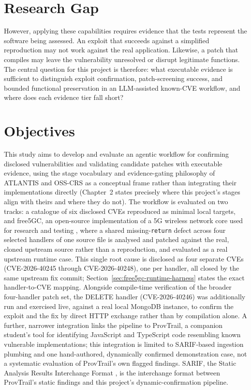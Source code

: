 \documentclass[12pt,a4paper]{report}
\begin{document}
\section{Research Gap}

However, applying these capabilities requires evidence that the tests represent the software being assessed. An exploit that succeeds against a simplified reproduction may not work against the real application. Likewise, a patch that compiles may leave the vulnerability unresolved or disrupt legitimate functions. The central question for this project is therefore: what executable evidence is sufficient to distinguish exploit confirmation, patch-screening success, and bounded functional preservation in an LLM-assisted known-CVE workflow, and where does each evidence tier fall short?

\section{Objectives}

This study aims to develop and evaluate an agentic workflow for confirming disclosed vulnerabilities and validating candidate patches with executable evidence, using the stage vocabulary and evidence-gating philosophy of ATLANTIS and OSS-CRS as a conceptual frame rather than integrating their implementations directly (Chapter~2 states precisely where this project's stages align with theirs and where they do not). The workflow is evaluated on two tracks: a catalogue of six disclosed CVEs reproduced as minimal local targets, and free5GC, an open-source implementation of a 5G wireless network core used for research and testing \cite{free5gc}, where a shared missing-\texttt{return} defect across four selected handlers of one source file is analysed and patched against the real, cloned upstream source rather than a reproduction, and evaluated as a real upstream runtime case. This single root cause is disclosed as four separate CVEs (CVE-2026-40245 through CVE-2026-40248), one per handler, all closed by the same upstream fix commit; Section~\ref{sec:free5gc-runtime-harness} states the exact handler-to-CVE mapping. Alongside compile-time verification of the broader four-handler patch set, the DELETE handler (CVE-2026-40246) was additionally run and exercised live, against a real local MongoDB instance, to confirm the exploit and the fix by direct HTTP exchange rather than by compilation alone. A further, narrower integration links the pipeline to ProvTrail, a companion student's tool for identifying JavaScript and TypeScript code resembling known vulnerable implementations; this integration is limited to SARIF-based ingestion plumbing and one hand-authored, dynamically confirmed demonstration case, not a systematic evaluation of ProvTrail's own flagged findings. SARIF, the Static Analysis Results Interchange Format \cite{sarif}, is the interchange format between ProvTrail's static findings and this project's dynamic-confirmation pipeline.
\end{document}
